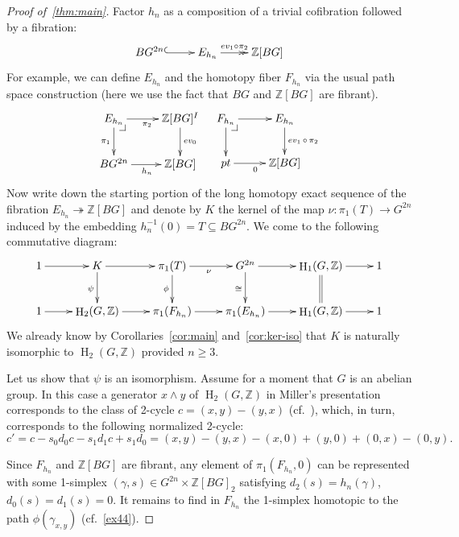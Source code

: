 \documentclass[oneside, 12pt]{amsart}
\makeatletter
\theoremstyle{plain}
\numberwithin{equation}{section}
\numberwithin{lemma}{section}
\theoremstyle{remark}
\theoremstyle{definition}
\DeclareMathOperator{\HH}{H}
\newcommand{\ZZ}{\mathbb{Z}}
\newcommand{\pullbackcorner}[1][dr]{\save*!/#1-1.2pc/#1:(-1,1)@^{|-}\restore}
\makeatother
\begin{document}
\begin{proof}[Proof of~\cref{thm:main}]
Factor $h_n$ as a composition of a trivial cofibration followed by a fibration: 
\begin{equation} \label{eq:fibr-repl} \xymatrix{BG^{2n} \ar@{^{(}->}[r] & E_{h_n} \ar@{->>}^(.45){ev_1 \circ \pi_2}[r] & \ZZ[BG]} \end{equation}
For example, we can define $E_{h_n}$ and the homotopy fiber $F_{h_n}$ via the usual path space construction
 (here we use the fact that $BG$ and $\ZZ[BG]$ are fibrant).
\[ \xymatrix{ E_{h_n}  \ar[r]_{\pi_2} \ar[d]_{\pi_1} \pullbackcorner & \ar[d]^{ev_0} \ZZ[BG]^I\\
              BG^{2n} \ar[r]_{h_n} & \ZZ[BG] } \ \ \ 
   \xymatrix{ F_{h_n}  \ar[r] \ar[d] \pullbackcorner & \ar[d]^{ev_1\,\circ\,\pi_2} E_{h_n} \\
              pt \ar[r]_{0} & \ZZ[BG]}  \]
Now write down the starting portion of the long homotopy exact sequence of the fibration $E_{h_n} \twoheadrightarrow \ZZ[BG]$ and
 denote by $K$ the kernel of the map $\nu\colon \pi_1(T) \to G^{2n}$ induced by the embedding $h_n^{-1}(0)=T \subseteq BG^{2n}$.
We come to the following commutative diagram:
\[ \xymatrix{1 \ar[r] & K       \ar[d]_{\psi} \ar[r] & \pi_1(T) \ar[d]_{\phi} \ar[r]_{\nu}     & G^{2n} \ar[r] \ar[d]_{\cong} & \HH_1(G, \ZZ) \ar[r] \ar@{=}[d] & 1 \\
             1 \ar[r] & \HH_2(G, \ZZ) \ar[r] & \pi_1(F_{h_n})           \ar[r]  & \pi_1(E_{h_n}) \ar[r]                       & \HH_1(G, \ZZ) \ar[r] & 1}\]
We already know by Corollaries~\ref{cor:main} and~\ref{cor:ker-iso} that $K$ is naturally isomorphic to $\HH_2(G, \ZZ)$ provided $n\geq 3$.

Let us show that $\psi$ is an isomorphism. Assume for a moment that $G$ is an abelian group.
In this case a generator $x \wedge y$ of $\HH_2(G, \ZZ)$ in Miller's presentation corresponds to the class of 2-cycle $c = (x, y) - (y, x)$ (cf.~\cite[(14), p.~582]{Mi52}), which,
  in turn, corresponds to the following normalized 2-cycle:
\begin{equation} \label{eq:normalized} c' = c - s_0d_0c - s_1d_1c + s_1d_0 = (x, y) - (y, x) - (x, 0) +(y, 0) + (0, x) - (0, y). \end{equation}
 
Since $F_{h_n}$ and $\ZZ[BG]$ are fibrant, any element of $\pi_1(F_{h_n}, 0)$ can be represented with 
 some 1-simplex $(\gamma, s) \in G^{2n} \times \ZZ[BG]_2$ satisfying $d_2(s) = h_n(\gamma)$, $d_0(s) = d_1(s)=0$. 
It remains to find in $F_{h_n}$ the 1-simplex homotopic to the path $\phi(\gamma_{x,y})$ (cf.~\cref{ex44}).


\end{proof}
\end{document}
